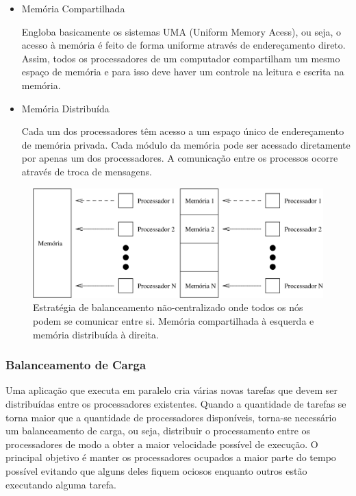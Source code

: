   \begin{itemize}
    \item Memória Compartilhada

    Engloba basicamente os sistemas UMA (Uniform Memory Acess), ou seja, o acesso à memória é feito de forma uniforme através de endereçamento direto. Assim, todos os processadores de um computador compartilham um mesmo espaço de memória e para isso deve haver um controle na leitura e escrita na memória.

    \item Memória Distribuída
    
    Cada um dos processadores têm acesso a um espaço único de endereçamento de memória privada. Cada módulo da memória pode ser acessado diretamente por apenas um dos processadores. A comunicação entre os processos ocorre através de troca de mensagens.   
  \end{itemize}

   \begin{figure}[htbp]
     \centering
     \includegraphics[width=1.0\textwidth]{fig/arquiteturas.png}
     \caption{Estratégia de balanceamento não-centralizado onde todos os nós podem se comunicar entre si. Memória compartilhada à esquerda e memória distribuída à direita.} 
     \label{fig:arquiteturas}
 \end{figure}

\subsubsection{Balanceamento de Carga}\label{Balanceamento de carga}

Uma aplicação que executa em paralelo cria várias novas tarefas que devem ser distribuídas entre os processadores existentes. Quando a quantidade de tarefas se torna maior que a quantidade de processadores disponíveis, torna-se necessário um balanceamento de carga, ou seja,  distribuir o processamento entre os processadores de modo a obter a maior velocidade possível de execução. O principal objetivo é manter os processadores ocupados a maior parte do tempo possível evitando que alguns deles fiquem ociosos enquanto outros estão executando alguma tarefa. 

